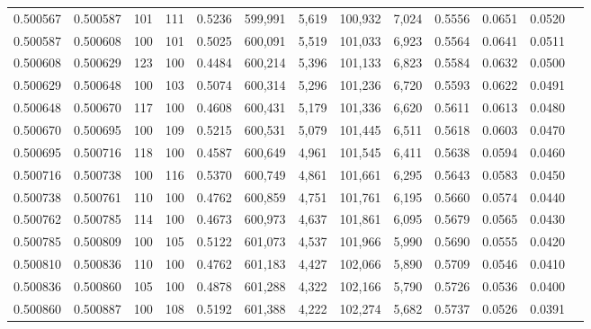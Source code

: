 \begin{tabular}{rrrrrrrrrrrrr}
0.500567 & 0.500587 &   101 & 111 &                                     0.5236 & 599,991 &   5,619 & 100,932 &   7,024 & 0.5556 & 0.0651 & 0.0520 \\
0.500587 & 0.500608 &   100 & 101 &                                     0.5025 & 600,091 &   5,519 & 101,033 &   6,923 & 0.5564 & 0.0641 & 0.0511 \\
0.500608 & 0.500629 &   123 & 100 &                                     0.4484 & 600,214 &   5,396 & 101,133 &   6,823 & 0.5584 & 0.0632 & 0.0500 \\
0.500629 & 0.500648 &   100 & 103 &                                     0.5074 & 600,314 &   5,296 & 101,236 &   6,720 & 0.5593 & 0.0622 & 0.0491 \\
0.500648 & 0.500670 &   117 & 100 &                                     0.4608 & 600,431 &   5,179 & 101,336 &   6,620 & 0.5611 & 0.0613 & 0.0480 \\
0.500670 & 0.500695 &   100 & 109 &                                     0.5215 & 600,531 &   5,079 & 101,445 &   6,511 & 0.5618 & 0.0603 & 0.0470 \\
0.500695 & 0.500716 &   118 & 100 &                                     0.4587 & 600,649 &   4,961 & 101,545 &   6,411 & 0.5638 & 0.0594 & 0.0460 \\
0.500716 & 0.500738 &   100 & 116 &                                     0.5370 & 600,749 &   4,861 & 101,661 &   6,295 & 0.5643 & 0.0583 & 0.0450 \\
0.500738 & 0.500761 &   110 & 100 &                                     0.4762 & 600,859 &   4,751 & 101,761 &   6,195 & 0.5660 & 0.0574 & 0.0440 \\
0.500762 & 0.500785 &   114 & 100 &                                     0.4673 & 600,973 &   4,637 & 101,861 &   6,095 & 0.5679 & 0.0565 & 0.0430 \\
0.500785 & 0.500809 &   100 & 105 &                                     0.5122 & 601,073 &   4,537 & 101,966 &   5,990 & 0.5690 & 0.0555 & 0.0420 \\
0.500810 & 0.500836 &   110 & 100 &                                     0.4762 & 601,183 &   4,427 & 102,066 &   5,890 & 0.5709 & 0.0546 & 0.0410 \\
0.500836 & 0.500860 &   105 & 100 &                                     0.4878 & 601,288 &   4,322 & 102,166 &   5,790 & 0.5726 & 0.0536 & 0.0400 \\
0.500860 & 0.500887 &   100 & 108 &                                     0.5192 & 601,388 &   4,222 & 102,274 &   5,682 & 0.5737 & 0.0526 & 0.0391 \\

\end{tabular}
